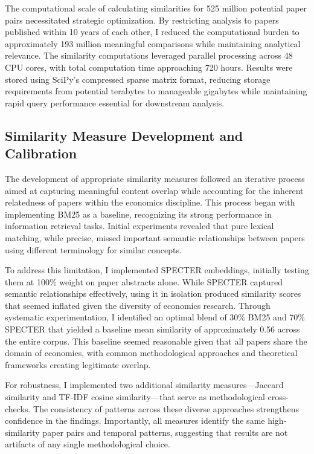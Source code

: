 \documentclass[12pt]{article}
\begin{document}
The computational scale of calculating similarities for 525 million potential paper pairs necessitated strategic optimization. By restricting analysis to papers published within 10 years of each other, I reduced the computational burden to approximately 193 million meaningful comparisons while maintaining analytical relevance. The similarity computations leveraged parallel processing across 48 CPU cores, with total computation time approaching 720 hours. Results were stored using SciPy's compressed sparse matrix format, reducing storage requirements from potential terabytes to manageable gigabytes while maintaining rapid query performance essential for downstream analysis.

\subsection{Similarity Measure Development and Calibration}

The development of appropriate similarity measures followed an iterative process aimed at capturing meaningful content overlap while accounting for the inherent relatedness of papers within the economics discipline. This process began with implementing BM25 as a baseline, recognizing its strong performance in information retrieval tasks. Initial experiments revealed that pure lexical matching, while precise, missed important semantic relationships between papers using different terminology for similar concepts.

To address this limitation, I implemented SPECTER embeddings, initially testing them at 100\% weight on paper abstracts alone. While SPECTER captured semantic relationships effectively, using it in isolation produced similarity scores that seemed inflated given the diversity of economics research. Through systematic experimentation, I identified an optimal blend of 30\% BM25 and 70\% SPECTER that yielded a baseline mean similarity of approximately 0.56 across the entire corpus. This baseline seemed reasonable given that all papers share the domain of economics, with common methodological approaches and theoretical frameworks creating legitimate overlap.

For robustness, I implemented two additional similarity measures—Jaccard similarity and TF-IDF cosine similarity—that serve as methodological cross-checks. The consistency of patterns across these diverse approaches strengthens confidence in the findings. Importantly, all measures identify the same high-similarity paper pairs and temporal patterns, suggesting that results are not artifacts of any single methodological choice.
\end{document}
